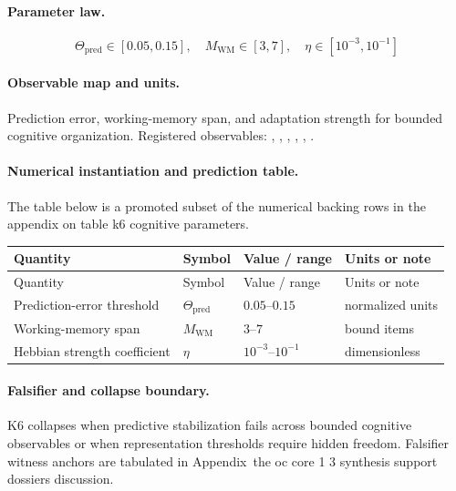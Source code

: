 \paragraph{Parameter law.}
\[
\Theta_{\mathrm{pred}} \in [0.05,0.15],\quad M_{\mathrm{WM}} \in [3,7],\quad \eta \in [10^{-3},10^{-1}]
\]

\paragraph{Observable map and units.}
Prediction error, working-memory span, and adaptation strength for bounded cognitive organization.
Registered observables: , \allowbreak {}, \allowbreak {}, \allowbreak {}, \allowbreak {}, \allowbreak {}.

\paragraph{Numerical instantiation and prediction table.}
The table below is a promoted subset of the numerical backing rows in the appendix on table k6 cognitive parameters.
\begin{longtable}{@{}L{0.27\textwidth}L{0.15\textwidth}L{0.24\textwidth}L{0.16\textwidth}@{}}
\toprule
Quantity & Symbol & Value / range & Units or note \\
\midrule
\endfirsthead
\toprule
Quantity & Symbol & Value / range & Units or note \\
\midrule
\endhead
Prediction-error threshold & $\scriptstyle \Theta_{\mathrm{pred}}$ & $0.05\text{--}0.15$ & normalized units \\
Working-memory span & $\scriptstyle M_{\mathrm{WM}}$ & $3\text{--}7$ & bound items \\
Hebbian strength coefficient & $\scriptstyle \eta$ & $10^{-3}\text{--}10^{-1}$ & dimensionless \\
\bottomrule
\end{longtable}

\paragraph{Falsifier and collapse boundary.}
K6 collapses when predictive stabilization fails across bounded cognitive observables or when representation thresholds require hidden freedom.
Falsifier witness anchors are tabulated in Appendix~the oc core 1 3 synthesis support dossiers discussion.

